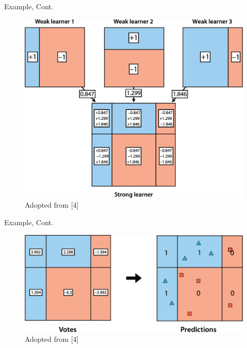\documentclass[serif, aspectratio=169]{beamer}
\begin{document}
\begin{frame}{Example, Cont.}
    \begin{center}
        \begin{figure}
            \includegraphics[width=\linewidth]{pic/adaboost_e4.png}
            {\scriptsize Adopted from [4]}
        \end{figure}
        \endminipage
    \end{center}
\end{frame}

\begin{frame}{Example, Cont.}
    \begin{center}
        \begin{figure}
            \includegraphics[width=\linewidth]{pic/adaboost_e5.png}
            {\scriptsize Adopted from [4]}
        \end{figure}
        \endminipage
    \end{center}
\end{frame}
\end{document}
